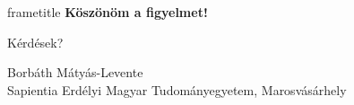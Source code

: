 \documentclass[aspectratio=169]{beamer}
\begin{document}
\begin{frame}[plain]
  \begin{beamercolorbox}[wd=\paperwidth,ht=2.2cm,dp=0pt,center]{frametitle}
    \vspace{0.6cm}
    {\Large\bfseries\color{white} Köszönöm a figyelmet!}
  \end{beamercolorbox}
  \vspace{1.4cm}
  \centering
  {\Large Kérdések?}

  \vspace{1.2em}
  {\small\color{primary}
    Borbáth Mátyás-Levente\\[0.3em]
    Sapientia Erdélyi Magyar Tudományegyetem, Marosvásárhely
  }\\[0.5em]
\end{frame}
\end{document}
